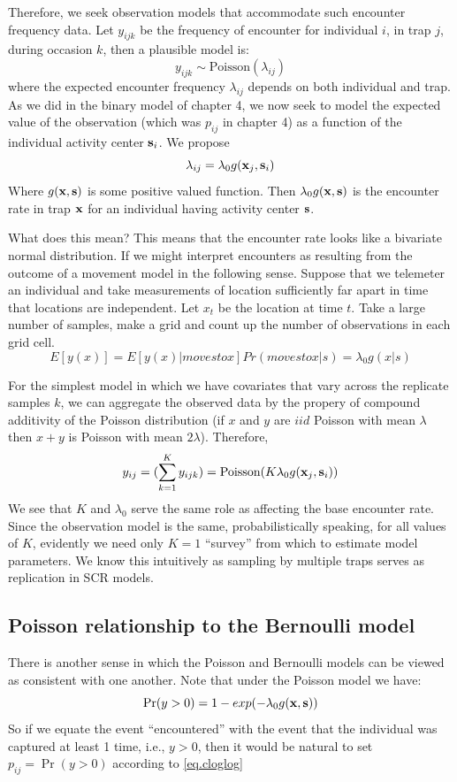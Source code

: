 Therefore, we seek observation models that accommodate such encounter
frequency data.  Let $y_{ijk}$ be the frequency of encounter for
individual $i$, in trap $j$, during occasion $k$, then a plausible
model is:
\[
 y_{ijk} \sim \mbox{Poisson}(\lambda_{ij})
\]
where the expected encounter frequency $\lambda_{ij}$ depends on both
individual and trap. As we did in the binary model of chapter 4, we
now seek to model the expected value of the observation (which was
$p_{ij}$ in chapter 4) as a function of the individual activity center
${\bf s}_{i}$.
We propose 
\[
 \lambda_{ij} = \lambda_{0}  g({\bf x}_{j},{\bf s}_{i})
\]
Where $g({\bf x},{\bf s})$ is some positive valued function. 
Then $\lambda_{0}g({\bf x},{\bf s})$ is the encounter rate in trap
${\bf x}$ for an individual having activity center ${\bf s}$.  


What does this mean? This means that the encounter rate looks like a
bivariate normal distribution.  If we might interpret encounters as
resulting from the outcome of a movement model in the following
sense. Suppose that we telemeter an individual and take measurements
of location sufficiently far apart in time that locations are
independent. Let $x_{t}$ be the location at time $t$. Take a large
number of samples, make a grid and count up the number of observations
in each grid cell.
\[
 E[y(x)] = E[y(x)| moves to x]Pr(moves to x|s) = \lambda_{0} g(x|s)
\]


For the simplest model in which we have covariates that vary across
the replicate samples $k$, we can aggregate the observed data by the
propery of compound additivity of the Poisson distribution (if $x$ and
$y$ are $iid$ Poisson with mean $\lambda$ then $x+y$ is Poisson with
mean $2\lambda$). Therefore,
\[
y_{ij} = (\sum_{k=1}^{K} y_{ijk}) =  \mbox{Poisson}(K  \lambda_{0} 
g({\bf x}_{j},{\bf s}_{i}) )
\]
We see that $K$ and $\lambda_{0}$ serve the same role as affecting the
base encounter rate. Since the observation model is the same,
probabilistically speaking, for all values of $K$, evidently we need
only $K=1$ ``survey'' from which to estimate model parameters. We know
this intuitively as sampling by multiple traps serves as replication
in SCR models.

\subsection{Poisson relationship to the Bernoulli model}


There is another sense in which the Poisson and Bernoulli models can
be viewed as consistent with one another. Note that under the Poisson
model we have:
\begin{equation}
 \Pr(y>0) = 1-exp(-\lambda_{0} g({\bf x},{\bf s}))
\label{eq.cloglog}
\end{equation}
So
if we equate the event ``encountered'' with the event that the
individual was captured at least 1 time, i.e., $y>0$, then it would be
natural to set $p_{ij} = \Pr(y>0)$ according to \ref{eq.cloglog}

